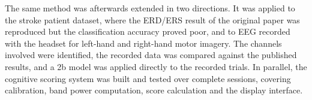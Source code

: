 The same method was afterwards extended in two directions. It was applied to the stroke
patient dataset, where the ERD/ERS result of the original paper was reproduced but the
classification accuracy proved poor, and to EEG recorded with the headset for left-hand
and right-hand motor imagery. The channels involved were identified, the recorded data was
compared against the published results, and a 2b model was applied directly to the
recorded trials. In parallel, the cognitive scoring system was built and tested over
complete sessions, covering calibration, band power computation, score calculation and the
display interface.